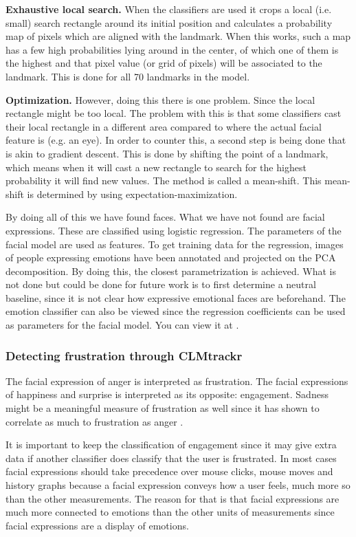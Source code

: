 \textbf{Exhaustive local search.} When the classifiers are used it crops a local (i.e. small) search rectangle around its initial position and calculates a probability map of pixels which are aligned with the landmark. When this works, such a map has a few high probabilities lying around in the center, of which one of them is the highest and that pixel value (or grid of pixels) will be associated to the landmark. This is done for all 70 landmarks in the model. 

\textbf{Optimization.} However, doing this there is one problem. Since the local rectangle might be too local. The problem with this is that some classifiers cast their local rectangle in a different area compared to where the actual facial feature is (e.g. an eye). In order to counter this, a second step is being done that is akin to gradient descent. This is done by shifting the point of a landmark, which means when it will cast a new rectangle to search for the highest probability it will find new values. The method is called a mean-shift. This mean-shift is determined by using expectation-maximization.

By doing all of this we have found faces. What we have not found are facial expressions. These are classified using logistic regression. The parameters of the facial model are used as features. To get training data for the regression, images of people expressing emotions have been annotated and projected on the PCA decomposition. By doing this, the closest parametrization is achieved. What is not done but could be done for future work is to first determine a neutral baseline, since it is not clear how expressive emotional faces are beforehand. The emotion classifier can also be viewed since the regression coefficients can be used as parameters for the facial model. You can view it at \cite{auduno2014b}.

\subsubsection{Detecting frustration through CLMtrackr}
The facial expression of anger is interpreted as frustration. The facial expressions of happiness and surprise is interpreted as its opposite: engagement. Sadness might be a meaningful measure of frustration as well since it has shown to correlate as much to frustration as anger \cite{kuppens2003}.

It is important to keep the classification of engagement since it may give extra data if another classifier does classify that the user is frustrated. In most cases facial expressions should take precedence over mouse clicks, mouse moves and history graphs because a facial expression conveys how a user feels, much more so than the other measurements. The reason for that is that facial expressions are much more connected to emotions than the other units of measurements since facial expressions are a display of emotions.

